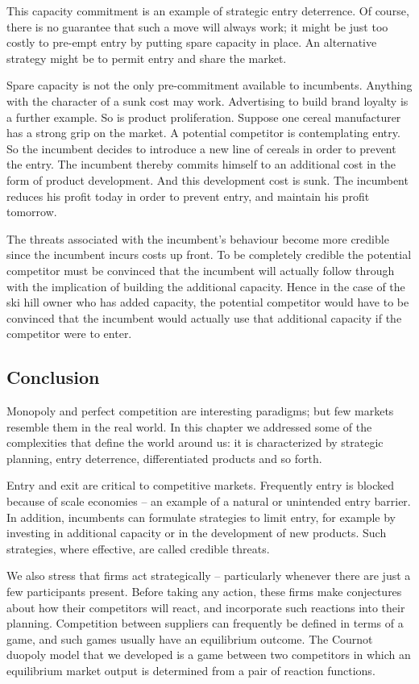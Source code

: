 This capacity commitment is an example of strategic entry deterrence. Of course, there is no guarantee that such a move will always work; it might be just too costly to pre-empt entry by putting spare capacity in place. An alternative strategy might be to permit entry and share the market.

Spare capacity is not the only pre-commitment available to incumbents. Anything with the character of a sunk cost may work. Advertising to build brand loyalty is a further example. So is product proliferation. Suppose one cereal manufacturer has a strong grip on the market. A potential competitor is contemplating entry. So the incumbent decides to introduce a new line of cereals in order to prevent the entry. The incumbent thereby commits himself to an additional cost in the form of product development. And this development cost is sunk. The incumbent reduces his profit today in order to prevent entry, and maintain his profit tomorrow. 

The threats associated with the incumbent's behaviour become more credible since the incumbent incurs costs up front. To be completely credible the potential competitor must be convinced that the incumbent will actually follow through with the implication of building the additional capacity. Hence in the case of the ski hill owner who has added capacity, the potential competitor would have to be convinced that the incumbent would actually use that additional capacity if the competitor were to enter.

\subsection*{Conclusion}

Monopoly and perfect competition are interesting paradigms; but few markets resemble them in the real world. In this chapter we addressed some of the complexities that define the world around us: it is characterized by strategic planning, entry deterrence, differentiated products and so forth. 

Entry and exit are critical to competitive markets. Frequently entry is blocked because of scale economies -- an example of a natural or unintended entry barrier. In addition, incumbents can formulate strategies to limit entry, for example by investing in additional capacity or in the development of new products. Such strategies, where effective, are called credible threats. 

We also stress that firms act strategically -- particularly whenever there are just a few participants present. Before taking any action, these firms make conjectures about how their competitors will react, and incorporate such reactions into their planning. Competition between suppliers can frequently be defined in terms of a game, and such games usually have an equilibrium outcome. The Cournot duopoly model that we developed is a game between two competitors in which an equilibrium market output is determined from a pair of reaction functions.

